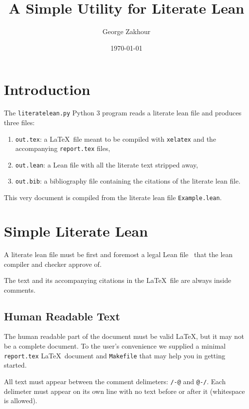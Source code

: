
\title{A Simple Utility for Literate Lean}
\author{George Zakhour}
\date{\today}
\maketitle

\section{Introduction}

The \texttt{literatelean.py} Python 3 program reads a literate lean file and produces three files:

\begin{enumerate}
  \item \texttt{out.tex}: a \LaTeX~file meant to be compiled with \texttt{xelatex} and the accompanying \texttt{report.tex} files,
  \item \texttt{out.lean}: a Lean file with all the literate text stripped away,
  \item \texttt{out.bib}: a bibliography file containing the citations of the literate lean file.
\end{enumerate}

This very document is compiled from the literate lean file \texttt{Example.lean}.

\section{Simple Literate Lean}

A literate lean file must be first and foremost a legal Lean file~\cite{moura2021lean} that the lean compiler and checker approve of.

The text and its accompanying citations in the \LaTeX~file are always inside comments.

\subsection{Human Readable Text}

The human readable part of the document must be valid \LaTeX, but it may not be a complete document.
To the user's convenience we supplied a minimal \texttt{report.tex} \LaTeX~document and \texttt{Makefile} that may help you in getting started.

All text must appear between the comment delimeters: \texttt{/-@} and \texttt{@-/}.
Each delimeter must appear on its own line with no text before or after it (whitespace is allowed).

